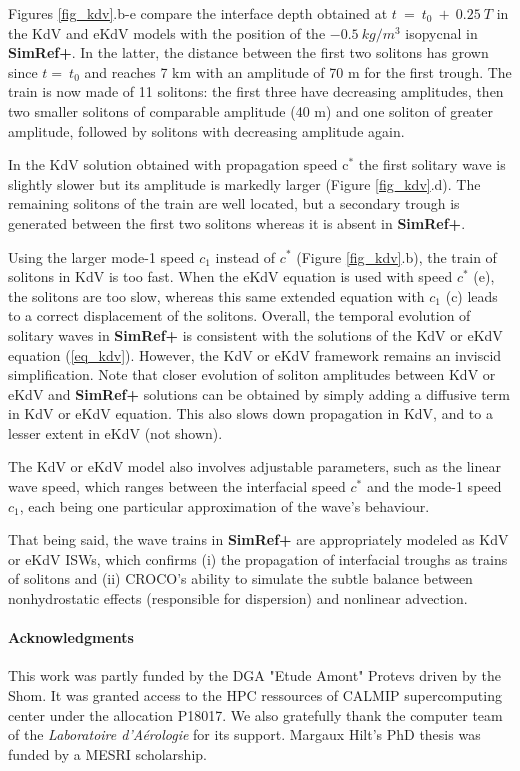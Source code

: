 Figures \ref{fig_kdv}.b-e compare the interface depth obtained at $t\ =\ t_0\ +\ 0.25\ T$ in the KdV and eKdV models with the position of the $-0.5\ kg/m^3$ isopycnal in \textbf{SimRef+}. In the latter, the distance between the first two solitons has grown since $t =\ t_0$ and reaches 7 km with an amplitude of 70 m for the first trough. The train is now made of 11 solitons: the first three have decreasing amplitudes, then two smaller solitons of comparable amplitude (40 m) and one soliton of greater amplitude, followed by solitons with decreasing amplitude again. 

In the KdV solution obtained with propagation speed c$^*$ the first solitary wave is slightly slower but its amplitude is markedly larger (Figure \ref{fig_kdv}.d). The remaining solitons of the train are well located, but a secondary trough is generated between the first two solitons whereas it is absent in \textbf{SimRef+}.

Using the larger mode-1 speed $c_1$ instead of $c^*$ (Figure \ref{fig_kdv}.b), the train of solitons in KdV is too fast. When the eKdV equation is used with speed $c^*$ (e), the solitons are too slow, whereas this same extended equation with $c_1$ (c) leads to a correct displacement of the solitons. 
Overall, the temporal evolution of solitary waves in \textbf{SimRef+} is consistent with the solutions of the KdV or eKdV equation (\ref{eq_kdv}). However, the KdV or eKdV framework remains an inviscid simplification. Note that closer evolution of soliton amplitudes between KdV or eKdV and \textbf{SimRef+} solutions can be obtained by simply adding a diffusive term in KdV or eKdV equation. This also slows down propagation in KdV, and to a lesser extent in eKdV (not shown).

The KdV or eKdV model also involves adjustable parameters, such as the linear wave speed, which ranges between the interfacial speed $c^*$ and the mode-1 speed $c_1$, each being one particular approximation of the wave's behaviour. 

That being said, the wave trains in \textbf{SimRef+} are appropriately modeled as KdV or eKdV ISWs, which confirms (i) the propagation of interfacial troughs as trains of solitons and (ii) CROCO's ability to simulate the subtle balance between nonhydrostatic effects (responsible for dispersion) and nonlinear advection. 
 

\paragraph{Acknowledgments} This work was partly funded by the DGA "Etude Amont" Protevs driven by the Shom. It was granted access to the HPC ressources of CALMIP supercomputing center under the allocation P18017. We also gratefully thank the computer team of the \textit{Laboratoire d'Aérologie} for its support. Margaux Hilt's PhD thesis was funded by a MESRI scholarship. 


%

%
